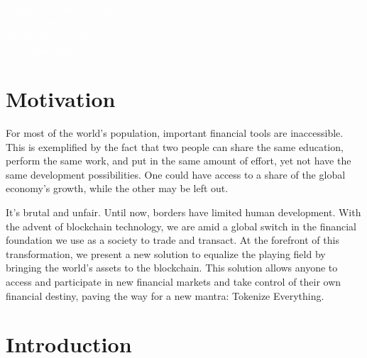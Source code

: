 \documentclass{article}
\begin{document}
\begin{sloppypar}

\begin{titlepage}
\sffamily\selectfont
\centering
\vspace*{7cm}
{}\\[5\baselineskip]
\textcolor{white}{
{\Huge Synthetic Assets on Cardano}\\[2\baselineskip]
{\Large Indigo Laboratories, Inc.}\\[0.5\baselineskip]
{\large info@indigo-labs.io}\\[3\baselineskip]
{\large November 2022, v1.1.0}
}
\end{titlepage}

\tableofcontents

\hypertarget{motivation}{%
\section{Motivation}\label{motivation}}

For most of the world's population, important financial tools are
inaccessible. This is exemplified by the fact that two people can share
the same education, perform the same work, and put in the same amount of
effort, yet not have the same development possibilities. One could have
access to a share of the global economy's growth, while the other may be
left out.

It's brutal and unfair. Until now, borders have limited human
development. With the advent of blockchain technology, we are amid a
global switch in the financial foundation we use as a society to trade
and transact. At the forefront of this transformation, we present a new
solution to equalize the playing field by bringing the world's assets to
the blockchain. This solution allows anyone to access and participate in
new financial markets and take control of their own financial destiny,
paving the way for a new mantra: Tokenize Everything.

\hypertarget{introduction}{%
\section{Introduction}\label{introduction}}


\end{sloppypar}
\end{document}

